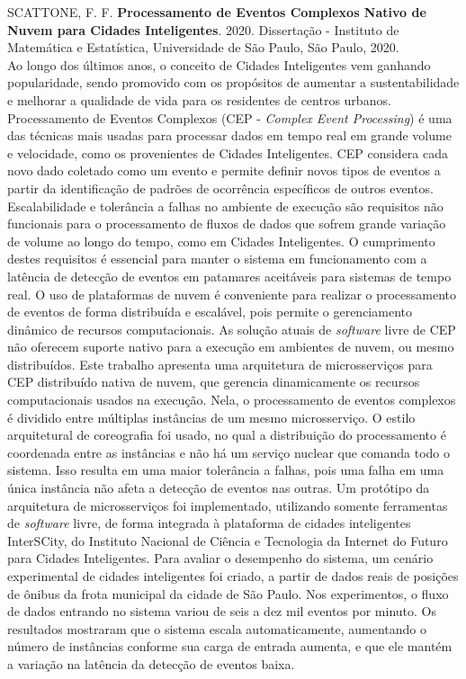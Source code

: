 \documentclass[11pt,twoside,a4paper]{book}
\begin{document}
\noindent SCATTONE, F. F. \textbf{Processamento de Eventos Complexos Nativo de Nuvem para Cidades Inteligentes}. 2020. Dissertação %
- Instituto de Matemática e Estatística, Universidade de São Paulo, São Paulo, 2020.\\
Ao longo dos últimos anos, o conceito de Cidades Inteligentes vem ganhando popularidade, sendo promovido com os propósitos de aumentar a sustentabilidade e melhorar a qualidade de vida para os residentes de centros urbanos. Processamento de Eventos Complexos (CEP - \emph{Complex Event Processing}) é uma das técnicas mais usadas para processar dados em tempo real em grande volume e velocidade, como os provenientes de Cidades Inteligentes. CEP considera cada novo dado coletado como um evento e permite definir novos tipos de eventos a partir da identificação de padrões de ocorrência específicos de outros eventos. Escalabilidade e tolerância a falhas no ambiente de execução são requisitos não funcionais para o processamento de fluxos de dados que sofrem grande variação de volume ao longo do tempo, como em Cidades Inteligentes. O cumprimento destes requisitos é essencial para manter o sistema em funcionamento com a latência de detecção de eventos em patamares aceitáveis para sistemas de tempo real. O uso de plataformas de nuvem é conveniente para realizar o processamento de eventos de forma distribuída e escalável, pois permite o gerenciamento dinâmico de recursos computacionais. 
As solução atuais de \textit{software} livre de CEP não oferecem suporte nativo para a execução em ambientes de nuvem, ou mesmo distribuídos.
Este trabalho apresenta uma arquitetura de microsserviços para CEP distribuído nativa de nuvem, que gerencia dinamicamente os recursos computacionais usados na execução. Nela, o processamento de eventos complexos é dividido entre múltiplas instâncias de um mesmo microsserviço. O estilo arquitetural de coreografia foi usado, no qual a distribuição do processamento é coordenada entre as instâncias e não há um serviço nuclear que comanda todo o sistema. Isso resulta em uma maior tolerância a falhas, pois uma falha em uma única instância não afeta a detecção de eventos nas outras. Um protótipo da arquitetura de microsserviços foi implementado, utilizando somente ferramentas de \textit{software} livre, de forma integrada à plataforma de cidades inteligentes InterSCity, do Instituto Nacional de Ciência e Tecnologia da Internet do Futuro para Cidades Inteligentes. Para avaliar o desempenho do sistema, um cenário experimental de cidades inteligentes foi criado, a partir de dados reais de posições de ônibus da frota municipal da cidade de São Paulo. Nos experimentos, o fluxo de dados entrando no sistema variou de seis a dez mil eventos por minuto. Os resultados mostraram que o sistema escala automaticamente, aumentando o número de instâncias conforme sua carga de entrada aumenta, e que ele mantém a variação na latência da detecção de eventos baixa.\\
\end{document}
